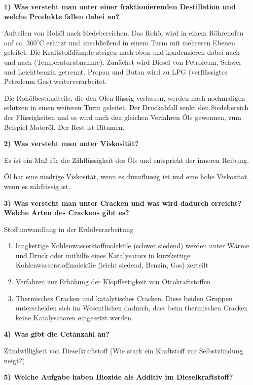 \textbf{1) Was versteht man unter einer fraktionierenden Destillation
und welche Produkte fallen dabei an?}

Aufteilen von Rohöl nach Siedebereichen. Das Rohöl wird in einem
Röhrenofen auf ca. $360^\circ\text{C}$ erhitzt und anschließend in
einem Turm mit mehreren Ebenen geleitet. Die Kraftstoffdämpfe steigen
nach oben und kondensieren dabei nach und nach (Temperaturabnahme).
Zunächst wird Diesel von Petroleum, Schwer- und Leichtbenzin getrennt.
Propan und Butan wird zu LPG (verflüssigtes Petroleum Gas)
weiterverarbeitet.

Die Rohölbestandteile, die den Ofen flüssig verlassen, werden nach
nochmaligen erhitzen in einen weiteren Turm geleitet. Der Druckabfall
senkt den Siedebereich der Flüssigkeiten und es wird nach den gleichen
Verfahren Öle gewonnen, zum Beispiel Motoröl. Der Rest ist Bitumen.

\textbf{2) Was versteht man unter Viskosität?}

Es ist ein Maß für die Zähflüssigkeit des Öls und entspricht der inneren
Reibung.

Öl hat eine niedrige Viskosität, wenn es dünnflüssig ist und eine hohe
Viskosität, wenn es zähflüssig ist.

\textbf{3) Was versteht man unter Cracken und was wird dadurch erreicht?
Welche Arten des Crackens gibt es?}

Stoffumwandlung in der Erdölverarbeitung

\begin{enumerate}
\item
  langkettige Kohlenwasserstoffmoleküle (schwer siedend) werden unter
  Wärme und Druck oder mithilfe eines Katalysators in kurzkettige
  Kohlenwasserstoffmoleküle (leicht siedend, Benzin, Gas) zerteilt
\item
  Verfahren zur Erhöhung der Klopffestigkeit von Ottokraftstoffen
\item
  Thermisches Cracken und katalytisches Cracken. Diese beiden Gruppen
  unterscheiden sich im Wesentlichen dadurch, dass beim thermischen
  Cracken keine Katalysatoren eingesetzt werden.
\end{enumerate}

\textbf{4) Was gibt die Cetanzahl an?}

Zündwilligkeit von Dieselkraftstoff (Wie stark ein Kraftstoff zur
Selbstzündung neigt?)

\textbf{5) Welche Aufgabe haben Biozide als Additiv im
Dieselkraftstoff?}

